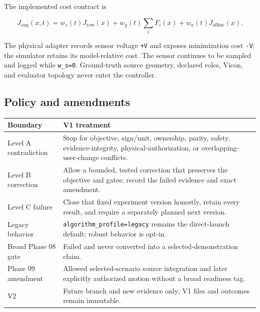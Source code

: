 \documentclass[
  10pt,
  letterpaper,
]{article}
\newcounter{none} %
\begin{document}
The implemented cost contract is

\[
J_{\mathrm{aug}}(x,t)=
w_s(t)J_{\mathrm{raw}}(x)+
w_g(t)\sum_i F_i(x)+
w_a(t)J_{\mathrm{affine}}(x).
\]

The physical adapter records sensor voltage \nolinkurl{+V} and exposes minimization cost
\nolinkurl{-V}; the simulator retains its model-relative cost. The sensor continues to
be sampled and logged while \nolinkurl{w\_s=0}. Ground-truth source geometry, declared
roles, Vicon, and evaluator topology never enter the controller.

\subsection{Policy and amendments}\label{policy-and-amendments}

{\def\LTcaptype{none} %
\begin{longtable}[]{@{}
  >{\raggedright\arraybackslash}p{}
  >{\raggedright\arraybackslash}p{}@{}}
\toprule\noalign{}
\begin{minipage}[b]{\linewidth}\raggedright
Boundary
\end{minipage} & \begin{minipage}[b]{\linewidth}\raggedright
V1 treatment
\end{minipage} \\
\midrule\noalign{}
\endhead
\bottomrule\noalign{}
\endlastfoot
Level A contradiction & Stop for objective, sign/unit, ownership, parity, safety, evidence-integrity, physical-authorization, or overlapping-user-change conflicts. \\
Level B correction & Allow a bounded, tested correction that preserves the objective and gates; record the failed evidence and exact amendment. \\
Level C failure & Close that fixed experiment version honestly, retain every result, and require a separately planned next version. \\
Legacy behavior & \nolinkurl{algorithm\_profile=legacy} remains the direct-launch default; robust behavior is opt-in. \\
Broad Phase 08 gate & Failed and never converted into a selected-demonstration claim. \\
Phase 09 amendment & Allowed selected-scenario source integration and later explicitly authorized motion without a broad readiness tag. \\
V2 & Future branch and new evidence only; V1 files and outcomes remain immutable. \\
\end{longtable}
}
\end{document}
